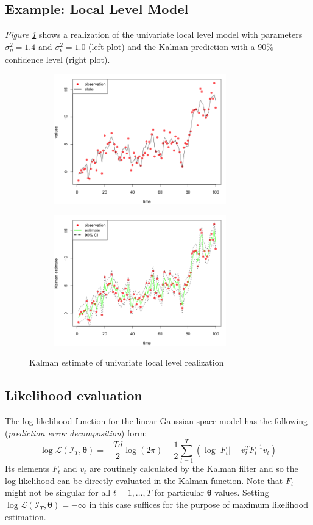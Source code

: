 \documentclass[11pt, oneside]{scrreprt}   	%
\begin{document}
\subsection{Example: Local Level Model}
\textit{Figure \ref{fig:ullm-kalman}} shows a realization of the univariate local level model with parameters $\sigma_{\eta}^2=1.4$ and $\sigma_{\epsilon}^2=1.0$ (left plot) and the Kalman prediction with a $90\%$ confidence level (right plot).
\begin{figure}[h!]
\centering
\begin{subfigure}{.5\textwidth}
  \centering
  \includegraphics[width=75mm]{../../images/ullm-realization.png}
\end{subfigure}%
\begin{subfigure}{.5\textwidth}
  \centering
  \includegraphics[width=75mm]{../../images/ullm-estimate-kalman.png}
\end{subfigure}
\caption{Kalman estimate of univariate local level realization}
\label{fig:ullm-kalman}
\end{figure}

\subsection{Likelihood evaluation}
The log-likelihood function for the linear Gaussian space model has the following (\textit{prediction error decomposition}) form:
$$
\log \mathcal{L}(\mathcal{I}_T, \boldsymbol{\theta}) = -\frac{Td}{2} \log(2 \pi) - \frac{1}{2} \sum_{t=1}^T (\log |F_t| + v_t^TF_t^{-1} v_t)
$$
Its elements $F_t$ and $v_t$ are routinely calculated by the Kalman filter and so the log-likelihood can be directly evaluated in the Kalman function. Note that $F_t$ might not be singular for all $t=1,\ldots, T$ for particular $\boldsymbol{\theta}$ values. Setting $\log \mathcal{L}(\mathcal{I}_T, \boldsymbol{\theta}) = -\infty$ in this case suffices for the purpose of maximum likelihood estimation.
\end{document}
